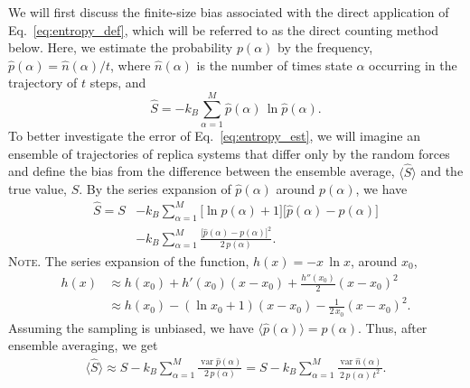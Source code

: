 \documentclass[reprint, superscriptaddress]{revtex4-1}
\newcommand{\note}[1]{{\color{DarkGreen}\footnotesize \textsc{Note.} #1}}
\begin{document}
We will first discuss the finite-size bias associated with
the direct application of Eq.~\eqref{eq:entropy_def},
which will be referred to as the direct counting method below.
%
Here, we estimate the probability $p(\alpha)$
by the frequency, $\hat{p}(\alpha) = \hat{n}(\alpha) / t$,
where $\hat{n}(\alpha)$ is the number of times state $\alpha$ occurring in the trajectory of $t$ steps,
and
%
\begin{equation}
  \hat S
  =
  -k_B \sum_{\alpha = 1}^M \hat{p}(\alpha) \, \ln \hat{p}(\alpha)
  .
  \label{eq:entropy_est}
\end{equation}
%
To better investigate the error of Eq.~\eqref{eq:entropy_est},
we will imagine an ensemble of trajectories of replica systems
that differ only by the random forces
and define the bias from the difference
between the ensemble average,
$\bigl\langle \hat S \bigr\rangle$
and the true value, $S$.
%
By the series expansion of $\hat{p}(\alpha)$ around $p(\alpha)$, we have
%
\begin{align*}
  \hat S
  =
  S
  &- k_B \sum_{\alpha = 1}^M
    \bigl[\ln p(\alpha) + 1 \bigr]
    \bigl[ \hat{p}(\alpha) - p(\alpha) \bigr]
  \\
  &- k_B \sum_{\alpha = 1}^M
    \frac{ \bigl[ \hat{p}(\alpha) - p(\alpha) \bigr]^2 } { 2 \, p(\alpha) }
  .
\end{align*}
%
\note{The series expansion of the function, $h(x) = -x \, \ln x$,
around $x_0$,
%
\begin{align*}
  h(x)
  &\approx h(x_0) + h'(x_0) (x - x_0) + \frac{h''(x_0)}{2} (x - x_0)^2 \\
  &\approx h(x_0) - (\ln x_0 + 1) ( x - x_0) - \frac{1}{2 \, x_0} (x - x_0)^2
  .
\end{align*}
}
%
Assuming the sampling is unbiased,
we have $\langle \hat{p}(\alpha) \rangle = p(\alpha)$.
%
Thus, after ensemble averaging, we get
%
\begin{align}
  \bigl\langle \hat S \bigr\rangle
  \approx
  S - k_B \sum_{\alpha = 1}^M
    \frac{ \operatorname{var} \hat{p}(\alpha) } { 2 \, p(\alpha) }
  =
  S - k_B \sum_{\alpha = 1}^M
    \frac{ \operatorname{var} \hat{n}(\alpha) } { 2 \, p(\alpha) \, t^2 }
  .
  \label{eq:entest_2nd}
\end{align}
\end{document}
